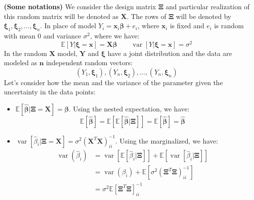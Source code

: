 \begin{remark}{\textbf{(Some notations)}}
    We consider the design matrix $\boldsymbol \Xi$ and particular realization of this random matrix will be denoted as $\boldsymbol X$. The rows of $\boldsymbol \Xi$ will be denoted by $\boldsymbol \xi_1,\boldsymbol \xi_2,\dots,\boldsymbol \xi_n$. In place of model $Y_i = \boldsymbol x_i\boldsymbol \beta + e_i$, where $\boldsymbol x_i$ is fixed and $e_i$ is random with mean $0$ and variance $\sigma^2$, where we have:
    \begin{equation*}
        \mathbb{E}[Y | \boldsymbol \xi = \boldsymbol x] = \boldsymbol X\boldsymbol \beta \qquad \operatorname{var}[Y | \boldsymbol \xi = \boldsymbol x] = \sigma^2
    \end{equation*}
    In the random $\boldsymbol X$ model, $\boldsymbol Y$ and $\boldsymbol \xi$ have a joint distribution and the data are modeled as $\boldsymbol n$ independent random vectors:
    \begin{equation*}
        (Y_1,\boldsymbol \xi_1), (Y_n,\boldsymbol \xi_2), \dots, (Y_n,\boldsymbol \xi_n)
    \end{equation*}
    Let's consider how the mean and the variance of the parameter given the uncertainty in the data points:
    \begin{itemize}
        \item $\mathbb{E}[\hat{\boldsymbol \beta} | \boldsymbol \Xi = \boldsymbol X ] = \boldsymbol \beta$. Using the nested expectation, we have:
        \begin{equation*}
            \mathbb{E}[\hat{\boldsymbol \beta}] = \mathbb{E}[\mathbb{E}[\hat{\boldsymbol \beta} | \boldsymbol \Xi]] = \mathbb{E}[\hat{\boldsymbol \beta}] = \hat{\boldsymbol \beta}
        \end{equation*}
        \item $\operatorname{var}[\hat{\beta}_i | \boldsymbol \Xi = \boldsymbol X] = \sigma^2(\boldsymbol X^T\boldsymbol X)^{-1}_{ii}$. Using the marginalized, we have:
        \begin{equation*}
        \begin{aligned}
            \operatorname{var}(\hat{\beta}_i) &= \operatorname{var}[\mathbb{E}[\hat{\beta}_i | \boldsymbol \Xi]] + \mathbb{E}[\operatorname{var}[\hat{\beta}_i | \boldsymbol \Xi]] \\
            &= \operatorname{var}(\beta_i) + \mathbb{E}[\sigma^2(\boldsymbol \Xi^T\boldsymbol \Xi)^{-1}_{ii}] \\
            &= \sigma^2 \mathbb{E}[\boldsymbol \Xi^T\boldsymbol \Xi]^{-1}_{ii} 

\end{aligned}
\end{equation*}
\end{itemize}
\end{remark}
